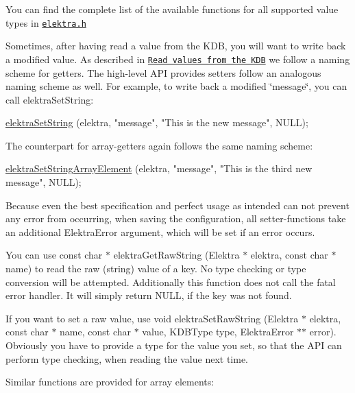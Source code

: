 You can find the complete list of the available functions for all supported value types in \href{/home/jenkins/workspace/libelektra-release/src/include/elektra.h}{\tt elektra.\+h}

Sometimes, after having read a value from the K\+DB, you will want to write back a modified value. As described in \href{#read-values-from-the-kdb}{\tt Read values from the K\+DB} we follow a naming scheme for getters. The high-\/level A\+PI provides setters follow an analogous naming scheme as well. For example, to write back a modified \char`\"{}message\char`\"{}, you can call {\ttfamily elektra\+Set\+String}\+:


\begin{DoxyCode}
\hyperlink{group__highlevel_ga563a695658e8e6f74183cca674edd1a7}{elektraSetString} (elektra, \textcolor{stringliteral}{"message"}, \textcolor{stringliteral}{"This is the new message"}, NULL);
\end{DoxyCode}


The counterpart for array-\/getters again follows the same naming scheme\+:


\begin{DoxyCode}
\hyperlink{group__highlevel_gaa5bba7a5c811437562d947420034fd03}{elektraSetStringArrayElement} (elektra, \textcolor{stringliteral}{"message"}, \textcolor{stringliteral}{"This is the third new
       message"}, NULL);
\end{DoxyCode}


Because even the best specification and perfect usage as intended can not prevent any error from occurring, when saving the configuration, all setter-\/functions take an additional {\ttfamily Elektra\+Error} argument, which will be set if an error occurs.

You can use {\ttfamily const char $\ast$ elektra\+Get\+Raw\+String (Elektra $\ast$ elektra, const char $\ast$ name)} to read the raw (string) value of a key. No type checking or type conversion will be attempted. Additionally this function does not call the fatal error handler. It will simply return {\ttfamily N\+U\+LL}, if the key was not found.

If you want to set a raw value, use {\ttfamily void elektra\+Set\+Raw\+String (Elektra $\ast$ elektra, const char $\ast$ name, const char $\ast$ value, K\+D\+B\+Type type, Elektra\+Error $\ast$$\ast$ error)}. Obviously you have to provide a type for the value you set, so that the A\+PI can perform type checking, when reading the value next time.

Similar functions are provided for array elements\+:


